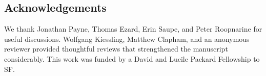 \documentclass[12pt,letterpaper]{article}
\begin{document}
\begin{refsection}
\section{Acknowledgements}

We thank Jonathan Payne, Thomas Ezard, Erin Saupe, and Peter Roopnarine for useful discussions. Wolfgang Kiessling, Matthew Clapham, and an anonymous reviewer provided thoughtful reviews that strengthened the manuscript considerably. This work was funded by a David and Lucile Packard Fellowship to SF.


\printbibliography
\end{refsection}
\end{document}
